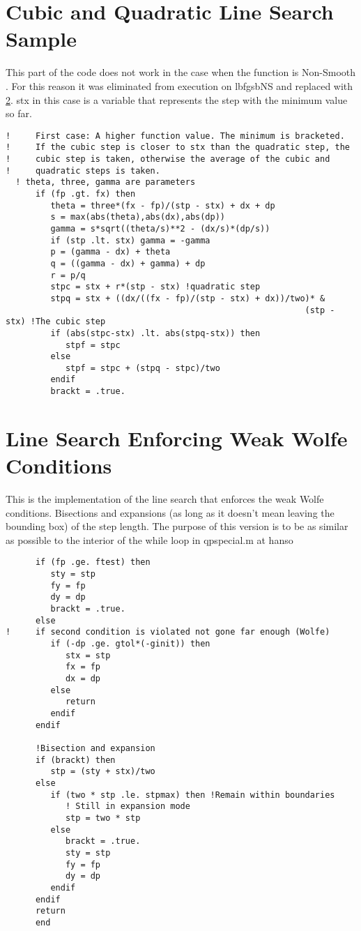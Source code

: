 \section{Cubic and Quadratic Line Search Sample}
This part of the code does not work in the case when the function is Non-Smooth \label{nsnowork}. For this reason it was eliminated from execution on lbfgsbNS and replaced with \ref{linesearchww}. stx in this case is a variable that represents the step with the minimum value so far.
\lstset{
  firstnumber = 3881
}

\begin{lstlisting}
!     First case: A higher function value. The minimum is bracketed. 
!     If the cubic step is closer to stx than the quadratic step, the 
!     cubic step is taken, otherwise the average of the cubic and 
!     quadratic steps is taken.
  ! theta, three, gamma are parameters
      if (fp .gt. fx) then
         theta = three*(fx - fp)/(stp - stx) + dx + dp
         s = max(abs(theta),abs(dx),abs(dp))
         gamma = s*sqrt((theta/s)**2 - (dx/s)*(dp/s))
         if (stp .lt. stx) gamma = -gamma
         p = (gamma - dx) + theta
         q = ((gamma - dx) + gamma) + dp
         r = p/q
         stpc = stx + r*(stp - stx) !quadratic step
         stpq = stx + ((dx/((fx - fp)/(stp - stx) + dx))/two)* &
                                                            (stp - stx) !The cubic step
         if (abs(stpc-stx) .lt. abs(stpq-stx)) then
            stpf = stpc
         else
            stpf = stpc + (stpq - stpc)/two
         endif
         brackt = .true.
\end{lstlisting}

\section{Line Search Enforcing Weak Wolfe Conditions}\label{linesearchww}
This is the implementation of the line search that enforces the weak Wolfe conditions. Bisections and expansions (as long as it doesn't mean leaving the bounding box) of the step length. The purpose of this version is to be as similar as possible to the interior of the while loop in qpspecial.m at hanso \citep{hanso}
\lstset{
  firstnumber = 4425
}

\begin{lstlisting}
      if (fp .ge. ftest) then 
         sty = stp
         fy = fp
         dy = dp
         brackt = .true.
      else
!     if second condition is violated not gone far enough (Wolfe)
         if (-dp .ge. gtol*(-ginit)) then
            stx = stp
            fx = fp
            dx = dp
         else
            return
         endif
      endif   
      
      !Bisection and expansion
      if (brackt) then
         stp = (sty + stx)/two
      else
         if (two * stp .le. stpmax) then !Remain within boundaries
            ! Still in expansion mode
            stp = two * stp
         else
            brackt = .true.
            sty = stp
            fy = fp
            dy = dp
         endif
      endif
      return
      end
\end{lstlisting}

